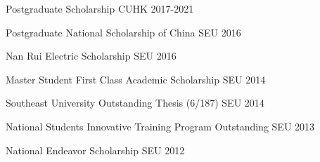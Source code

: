 




\begin{cvhonors}






\cvhonor
{Postgraduate Scholarship} %
{} %
{CUHK} %
{2017-2021} %

\cvhonor
{Postgraduate National Scholarship of China} %
{} %
{SEU} %
{2016} %

\cvhonor
{Nan Rui Electric Scholarship} %
{} %
{SEU} %
{2016} %

\cvhonor
{Master Student First Class Academic Scholarship} %
{} %
{SEU} %
{2014} %

\cvhonor
{Southeast University Outstanding Thesis} %
{(6/187)} %
{SEU} %
{2014} %

\cvhonor
{National Students Innovative Training Program} %
{Outstanding} %
{SEU} %
{2013} %

\cvhonor
{National Endeavor Scholarship} %
{} %
{SEU} %
{2012} %


%
%
%
%


\end{cvhonors}
